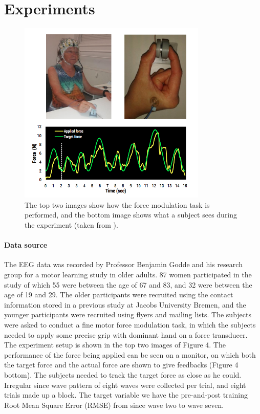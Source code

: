 \documentclass[a4paper,11pt,oneside]{article}
\begin{document}
\section{Experiments}
\begin{figure}[h]
	\centering
	\includegraphics[width=0.8\textwidth]{img/subject}
	\caption{The top two images show how the force modulation task is performed, and the bottom image shows what a subject sees during the experiment (taken from \cite{subject2016}).}
\end{figure}

\paragraph{Data source} The EEG data was recorded by Professor Benjamin Godde and his research group for a motor learning study in older adults. 87 women participated in the study of which 55 were between the age of 67 and 83, and 32 were between the age of 19 and 29. The older participants were recruited using the contact information stored in a previous study at Jacobs University Bremen, and the younger participants were recruited using flyers and mailing lists. The subjects were asked to conduct a fine motor force modulation task, in which the subjects needed to apply some precise grip with dominant hand on a force transducer. The experiment setup is shown in the top two images of Figure 4. The performance of the force being applied can be seen on a monitor, on which both the target force and the actual force are shown to give feedbacks (Figure 4 bottom). The subjects needed to track the target force as close as he could. Irregular since wave pattern of eight waves were collected per trial, and eight trials made up a block. The target variable we have the pre-and-post training Root Mean Square Error (RMSE)   from since wave two to wave seven.
\end{document}
